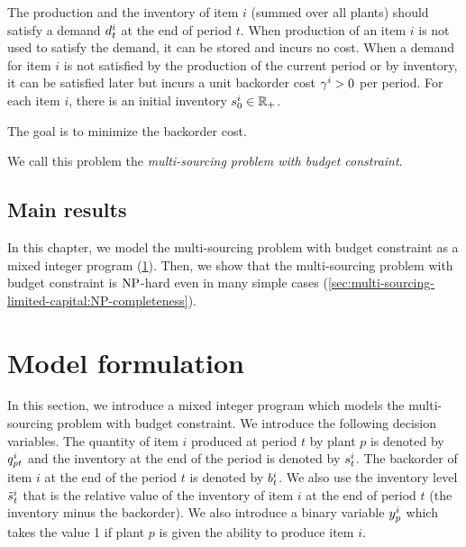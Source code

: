 The production and the inventory of item $i$ (summed over all plants) should satisfy a demand $d_t^i$ at the end of period $t$.
When production of an item $i$ is not used to satisfy the demand, it can be stored and incurs no cost.
When a demand for item $i$ is not satisfied by the production of the current period or by inventory, it can be satisfied later but incurs a unit backorder cost $\gamma^i>0$ per period.
For each item $i$, there is an initial inventory $s_0^i\in\mathbb{R}_+$.


The goal is to minimize the backorder cost.


We call this problem the \emph{multi-sourcing problem with budget constraint}.


\subsection{Main results}


In this chapter, we model the multi-sourcing problem with budget constraint as a mixed integer program (\cref{sec:multi-sourcing-limited-capital:model-formulation}).
Then, we show that the multi-sourcing problem with budget constraint is $\operatorname{NP}$-hard even in many simple cases (\cref{sec:multi-sourcing-limited-capital:NP-completeness}).






\section{Model formulation}
\label{sec:multi-sourcing-limited-capital:model-formulation}


In this section, we introduce a mixed integer program which models the multi-sourcing problem with budget constraint.
We introduce the following decision variables.
The quantity of item $i$ produced at period $t$ by plant $p$ is denoted by $q_{pt}^i$ and the inventory at the end of the period is denoted by $s_t^i$.
The backorder of item $i$ at the end of the period $t$ is denoted by $b_t^i$.
We also use the inventory level $\tilde{s}_t^i$ that is the relative value of the inventory of item $i$ at the end of period $t$ (\ie the inventory minus the backorder).
We also introduce a binary variable $y_p^i$ which takes the value 1 if plant $p$ is given the ability to produce item $i$.



